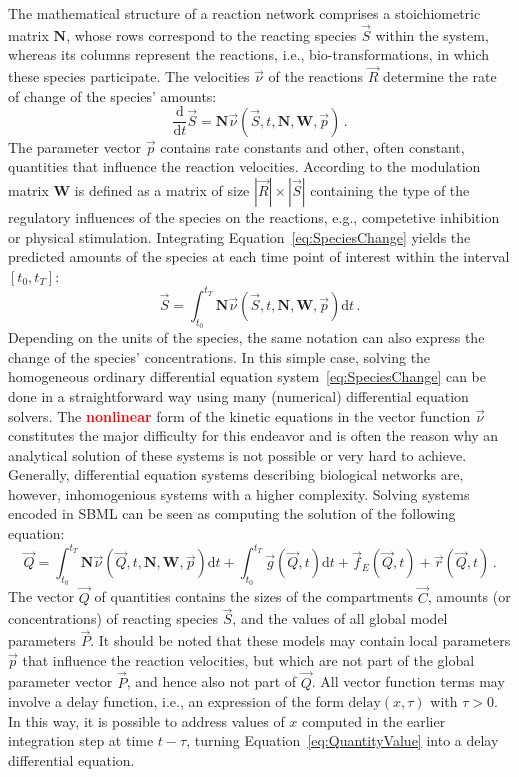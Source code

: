 \documentclass[10pt]{bmc_article}
\newenvironment{bmcformat}{\baselineskip20pt\sloppy\setboolean{publ}{false}}{\baselineskip20pt\sloppy}
\newcommand{\TODO}[1]{\textcolor{red}{\textbf{#1}}}
\newcommand{\D}{\mathrm{d}}
\begin{document}
\begin{bmcformat}
The mathematical structure of a reaction network comprises a stoichiometric
matrix $\mathbf{N}$, whose rows correspond to the reacting species $\vec{S}$
within the system, whereas its columns represent the reactions, i.e., bio-transformations,
in which these species participate.
The velocities $\vec{\nu}$ of the reactions $\vec{R}$ determine the rate of
change of the species' amounts:
\begin{equation}
\frac{\D}{\D t}\vec{S} = \mathbf{N}\vec{\nu}(\vec{S}, t, \mathbf{N}, \mathbf{W}, \vec{p})\,.
\label{eq:SpeciesChange}
\end{equation}
The parameter vector $\vec{p}$ contains rate constants and other, often
constant, quantities that influence the reaction velocities.
According to \cite{Liebermeister2006, Liebermeister2010} the modulation matrix
$\mathbf{W}$ is defined as a matrix of size $|\vec{R}|\times|\vec{S}|$
containing the type of the regulatory influences of the species on
the reactions, e.g., competetive inhibition or physical stimulation.
Integrating Equation~\ref{eq:SpeciesChange} yields the predicted amounts of the
species at each time point of interest within the interval $[t_0, t_T]$:
\begin{equation}
\vec{S} = \int_{t_0}^{t_T} \mathbf{N}\vec{\nu}(\vec{S}, t, \mathbf{N}, \mathbf{W}, \vec{p})
\D t\,.
\end{equation}
Depending on the units of the species, the same notation can also express the
change of the species' concentrations.
In this simple case, solving the homogeneous ordinary
differential equation system~\ref{eq:SpeciesChange} can be done in a
straightforward way using many (numerical) differential equation solvers.
The \TODO{nonlinear} form of the kinetic equations in the vector function $\vec{\nu}$
constitutes the major difficulty for this endeavor and is often the reason why
an analytical solution of these systems is not possible or very hard to achieve.
Generally, differential equation systems describing biological networks are,
however, inhomogenious systems with a higher complexity.
Solving systems encoded in SBML can be seen as computing the solution of the following
equation:
\begin{equation}
\vec{Q} = \int_{t_0}^{t_T} \mathbf{N}\vec{\nu}(\vec{Q}, t, \mathbf{N}, \mathbf{W},
\vec{p})\D t + \int_{t_0}^{t_T} \vec{g}(\vec{Q}, t)\D t + \vec{f}_E(\vec{Q}, t) +
\vec{r}(\vec{Q}, t)\,.
\label{eq:QuantityValue}
\end{equation}
The vector $\vec{Q}$ of quantities contains the sizes of the
compartments $\vec{C}$, amounts (or concentrations) of reacting species
$\vec{S}$, and the values of all global model parameters $\vec{P}$.
It should be noted that these models may contain local parameters $\vec{p}$ that
influence the reaction velocities, but which are not part of the global parameter
vector $\vec{P}$, and hence also not part of $\vec{Q}$.
All vector function terms may involve a delay function, i.e., an expression of 
the form $\mathrm{delay}(x, \tau)$ with $\tau > 0$. In this way, it is possible
to address values of $x$ computed in the earlier integration step at time 
$t - \tau$, turning Equation~\ref{eq:QuantityValue}
into a delay differential equation.


\end{bmcformat}
\end{document}
